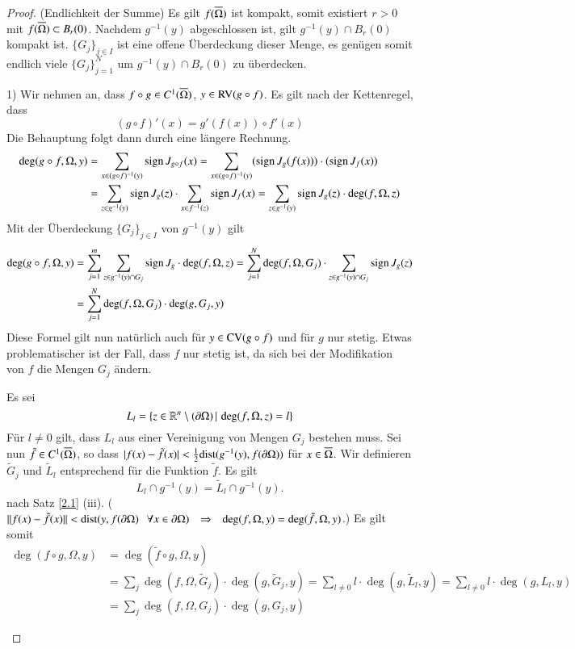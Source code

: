 \begin{proof}
    (Endlichkeit der Summe) Es gilt $f(\overline\Omega)$ ist kompakt, somit existiert $r>0$ mit $f(\overline \Omega)
    \subset B_r(0)$. Nachdem $g^{-1}(y)$ abgeschlossen ist, gilt $g^{-1}(y)\cap B_r(0)$ kompakt ist.
    $\{G_j\}_{j\in I}$ ist eine offene Überdeckung dieser Menge, es genügen somit endlich viele $\{  
    G_j \}_{j=1}^N$ um $g^{-1}(y)\cap B_r(0)$ zu überdecken.
    \begin{description}
    \item{1)}
    Wir nehmen an, dass $f\circ g\in C^1(\overline \Omega)$, $y\in \mathrm{RV}(g\circ f)$. Es gilt nach der
    Kettenregel, dass
    \[
        (g\circ f)'(x)=g'(f(x))\circ f'(x)
    \]
    Die Behauptung folgt dann durch eine längere Rechnung.
    \begin{align*}
        \deg(g\circ f,\Omega,y)&=\sum_{x\in(g\circ f)^{-1}(y)}\mathrm{sign}\, J_{g\circ f}(x)=\sum_{x\in (g\circ f)
        ^{-1} (y)}(\mathrm{sign}\, J_g(f(x)))\cdot(\mathrm{sign}\, J_f(x))\\
        &= \sum_{z\in g^{-1}(y)} \mathrm{sign}\, J_g(z)\cdot \sum_{x\in f^{-1}(z)} \mathrm{sign}\, J_f(x)
        =\sum_{z\in g^{-1}(y)} \mathrm{sign}\, J_g(z)\cdot \deg(f,\Omega,z)
    \end{align*}
    Mit der Überdeckung $\{G_j\}_{j\in I}$ von $g^{-1}(y)$ gilt
    \begin{align*}
        \deg(g\circ f,\Omega,y)&=\sum_{j=1}^m\sum_{z\in g^{-1}(y)\cap G_j}\mathrm{sign}\, J_g\cdot \deg(f,\Omega,z)
        =\sum_{j=1}^N \deg(f,\Omega,G_j) \cdot \sum_{z\in g^{-1}(y)\cap G_j} \mathrm{sign}\, J_g(z)\\
        &= \sum_{j=1}^N \deg(f,\Omega,G_j)\cdot \deg(g,G_j,y)
    \end{align*}
    Diese Formel gilt nun natürlich auch für $y\in \mathrm{CV}(g\circ f)$ und für $g$ nur stetig. Etwas
    problematischer ist der Fall, dass $f$ nur stetig ist, da sich bei der Modifikation von $f$ die
    Mengen $G_j$ ändern.

    Es sei
    \[
        L_l=\{z\in \mathbb{R}^n\setminus(\partial \Omega)\, | \, \deg(f,\Omega,z)=l\}
    \]
    Für $l\neq 0$ gilt, dass $L_l$ aus einer Vereinigung von Mengen $G_j$ bestehen muss. Sei nun
    $\tilde f\in C^1 (\overline \Omega)$, so dass $|f(x)-\tilde f(x)|< \frac 12 \mathrm{dist}(g^{-1}(y),
    f(\partial\Omega))$ für $x\in \overline \Omega$. Wir definieren $\tilde G_j$ und $\tilde L_l$ entsprechend
    für die Funktion $\tilde f$.
    Es gilt
    \[
        L_l\cap g^{-1}(y)=\tilde L_l\cap g^{-1}(y).
    \]
    nach Satz \ref{2.1} (iii). ($\|f(x)-\tilde f(x)\|<\mathrm{dist}(y,f(\partial \Omega)\hspace{.25cm} \forall
    x\in \partial \Omega)\hspace{.25cm} \Rightarrow \hspace{.25cm} \deg(f,\Omega,y)=\deg(\tilde f,\Omega,y)$.) Es gilt somit
    \begin{align*}
        \deg(f\circ g, \Omega, y)&=\deg(\tilde f\circ g,\Omega,y)\\
        &=\sum_{j}\deg(f,\Omega,\tilde G_j)\cdot \deg(g,\tilde G_j,y)=\sum_{l\neq0} l\cdot\deg( g,\tilde
        L_l,y)=\sum_{l\neq 0} l\cdot \deg(g,L_l,y)\\
        &=\sum_j \deg(f,\Omega,G_j)\cdot \deg(g,G_j,y)
    \end{align*}
    \end{description}
    \[  \]
\end{proof}

